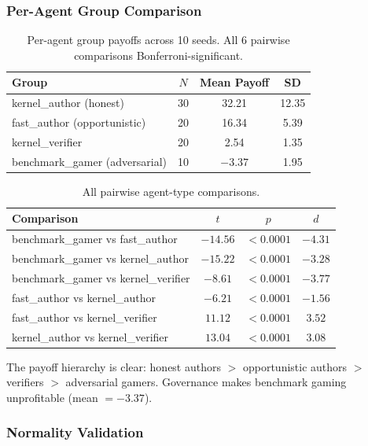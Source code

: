 \documentclass[11pt]{article}
\begin{document}
\subsubsection{Per-Agent Group Comparison}

\begin{table}[H]
\centering
\caption{Per-agent group payoffs across 10 seeds. All 6 pairwise comparisons Bonferroni-significant.}
\small
\begin{tabular}{@{}lccc@{}}
\toprule
Group & $N$ & Mean Payoff & SD \\
\midrule
kernel\_author (honest) & 30 & 32.21 & 12.35 \\
fast\_author (opportunistic) & 20 & 16.34 & 5.39 \\
kernel\_verifier & 20 & 2.54 & 1.35 \\
benchmark\_gamer (adversarial) & 10 & $-3.37$ & 1.95 \\
\bottomrule
\end{tabular}
\end{table}

\begin{table}[H]
\centering
\caption{All pairwise agent-type comparisons.}
\small
\begin{tabular}{@{}lccc@{}}
\toprule
Comparison & $t$ & $p$ & $d$ \\
\midrule
benchmark\_gamer vs fast\_author & $-14.56$ & $< 0.0001$ & $-4.31$ \\
benchmark\_gamer vs kernel\_author & $-15.22$ & $< 0.0001$ & $-3.28$ \\
benchmark\_gamer vs kernel\_verifier & $-8.61$ & $< 0.0001$ & $-3.77$ \\
fast\_author vs kernel\_author & $-6.21$ & $< 0.0001$ & $-1.56$ \\
fast\_author vs kernel\_verifier & $11.12$ & $< 0.0001$ & $3.52$ \\
kernel\_author vs kernel\_verifier & $13.04$ & $< 0.0001$ & $3.08$ \\
\bottomrule
\end{tabular}
\end{table}

The payoff hierarchy is clear: honest authors $>$ opportunistic authors $>$ verifiers $>$ adversarial gamers. Governance makes benchmark gaming unprofitable (mean $= -3.37$).

\subsubsection{Normality Validation}
\end{document}

